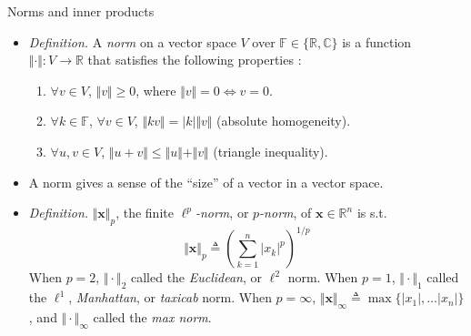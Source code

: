 \documentclass{beamer}
\numberwithin{equation}{section}
\begin{document}
\begin{frame}{Norms and inner products}
    \begin{itemize}
        \item
        \textit{Definition.} A \textit{norm} on a vector space $ V $ over
        $ \mathbb{F} \in \{\mathbb{R}, \mathbb{C}\} $ is a function
        $ \Vert\cdot\Vert : V \rightarrow \mathbb{R} $ that satisfies the
        following properties \cite{jacob_linalg}:
        \begin{enumerate}
            \item
            $ \forall v \in V $, $ \Vert v\Vert \ge 0 $, where
            $ \Vert v\Vert = 0 \Leftrightarrow v = 0 $.

            \item
            $ \forall k \in \mathbb{F} $, $ \forall v \in V $,
            $ \Vert kv\Vert = |k|\Vert v\Vert $ (absolute homogeneity).

            \item
            $ \forall u, v \in V $, $ \Vert u + v\Vert \le
            \Vert u\Vert + \Vert v\Vert $ (triangle inequality).
        \end{enumerate}

        \item
        A norm gives a sense of the ``size'' of a vector in a vector space.

        \item
        \textit{Definition.} $ \Vert\mathbf{x}\Vert_p $, the finite
        $ \ell^p $\textit{-norm}, or $ p $\textit{-norm}, of
        $ \mathbf{x} \in \mathbb{R}^n $ is s.t.
        \begin{equation*}
            \Vert\mathbf{x}\Vert_p \triangleq
            \left(\sum_{k = 1}^n|x_k|^p\right)^{1 / p}
        \end{equation*}
        When $ p = 2 $, $ \Vert\cdot\Vert_2 $ called the \textit{Euclidean},
        or $ \ell^2 $ norm. When $ p = 1 $, $ \Vert\cdot\Vert_1 $ called the
        $ \ell^1 $, \textit{Manhattan}, or \textit{taxicab} norm. When
        $ p = \infty $, $ \Vert\mathbf{x}\Vert_\infty \triangleq
        \max\{|x_1|, \ldots |x_n|\} $, and $ \Vert\cdot\Vert_\infty $ called
        the \textit{max norm}.
    \end{itemize}
\end{frame}
\end{document}
